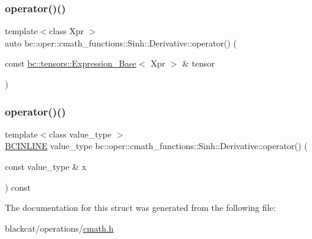 \mbox{\label{structbc_1_1oper_1_1cmath__functions_1_1Sinh_1_1Derivative_aabf900f144c91b36808c453c7cb44e50}} 
\subsubsection{\texorpdfstring{operator()()}{operator()()}\hspace{0.1cm}{\footnotesize\ttfamily [2/3]}}
{\footnotesize\ttfamily template$<$class Xpr $>$ \\
auto bc\+::oper\+::cmath\+\_\+functions\+::\+Sinh\+::\+Derivative\+::operator() (\begin{DoxyParamCaption}\item[{const \hyperlink{classbc_1_1tensors_1_1Expression__Base}{bc\+::tensors\+::\+Expression\+\_\+\+Base}$<$ Xpr $>$ \&}]{tensor }\end{DoxyParamCaption})\hspace{0.3cm}{\ttfamily [inline]}}

\mbox{\label{structbc_1_1oper_1_1cmath__functions_1_1Sinh_1_1Derivative_acc9c17432d2565c46f5a958c4fcfe827}} 
\subsubsection{\texorpdfstring{operator()()}{operator()()}\hspace{0.1cm}{\footnotesize\ttfamily [3/3]}}
{\footnotesize\ttfamily template$<$class value\+\_\+type $>$ \\
\hyperlink{common_8h_a6699e8b0449da5c0fafb878e59c1d4b1}{B\+C\+I\+N\+L\+I\+NE} value\+\_\+type bc\+::oper\+::cmath\+\_\+functions\+::\+Sinh\+::\+Derivative\+::operator() (\begin{DoxyParamCaption}\item[{const value\+\_\+type \&}]{x }\end{DoxyParamCaption}) const\hspace{0.3cm}{\ttfamily [inline]}}



The documentation for this struct was generated from the following file\+:\begin{DoxyCompactItemize}
\item 
blackcat/operations/\hyperlink{cmath_8h}{cmath.\+h}\end{DoxyCompactItemize}
